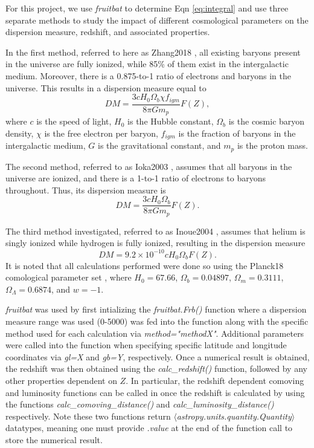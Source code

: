 \documentclass{article}
\begin{document}
For this project, we use {\it fruitbat} to determine Eqn \ref{eq:integral} and use three separate methods to study the impact of different cosmological parameters on the dispersion measure, redshift, and associated properties.

In the first method, referred to here as Zhang2018 \cite{Zhang2018}, all existing baryons present in the universe are fully ionized, while 85\% of them exist in the intergalactic medium. Moreover, there is a 0.875-to-1 ratio of electrons and baryons in the universe. This results in a dispersion measure equal to 
\begin{equation}
    DM=\frac{3cH_0\Omega_b\chi f_{igm} }{8\pi G m_p}F(Z),
\end{equation}
where $c$ is the speed of light, $H_0$ is the Hubble constant, $\Omega_b$ is the cosmic baryon density,  $\chi$ is the free electron per baryon, $f_{igm}$ is the fraction of baryons in the intergalactic medium, $G$ is the gravitational constant, and $m_p$ is the proton mass.

The second method, referred to as Ioka2003 \cite{Ioka2003}, assumes that all baryons in the universe are ionized, and there is a 1-to-1 ratio of electrons to baryons throughout. Thus, its dispersion measure is 
\begin{equation}
    DM=\frac{3cH_0 \Omega_b}{8\pi G m_p} F(Z).
\end{equation}

The third method investigated, referred to as Inoue2004 \cite{Inoue2004}, assumes that helium is singly ionized while hydrogen is fully ionized, resulting in the dispersion measure
\begin{equation}
    DM=9.2\times10^{-10}c H_0 \Omega_b F(Z).
\end{equation}
It is noted that all calculations performed were done so using the Planck18 comological parameter set \cite{Planck2018}, where $H_0=67.66$, $\Omega_b=0.04897$, $\Omega_m=0.3111$, $\Omega_\Lambda=0.6874$, and $w=-1$.

{\it fruitbat} was used by first intializing the \emph{fruitbat.Frb()} function where a dispersion measure range was used (0-5000) was fed into the function along with the specific method used for each calculation via \emph{method="methodX"}. Additional parameters were called into the function when specifying specific latitude and longitude coordinates via \emph{gl=X} and \emph{gb=Y}, respectively. Once a numerical result is obtained, the redshift was then obtained using the \emph{calc\_redshift()} function, followed by any other properties dependent on $Z$. In particular, the redshift dependent comoving and luminosity functions can be called in once the redshift is calculated by using the functions \emph{calc\_comoving\_distance()} and \emph{calc\_luminosity\_distance()} respectively. Note these two functions return {$\langle$\emph{astropy.units.quantity.Quantity}$\rangle$} datatypes, meaning one must provide \emph{.value} at the end of the function call to store the numerical result.
\end{document}
